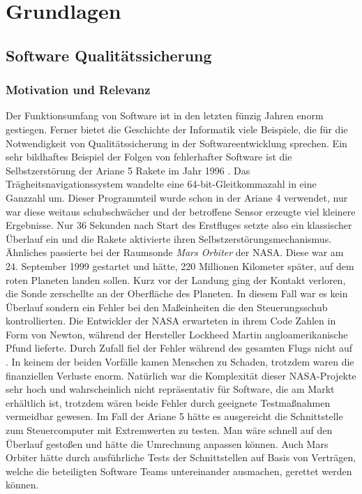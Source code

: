 \chapter{Grundlagen}
\label{sec:fundamentals}

\section{Software Qualitätssicherung}
\label{sec:software_quality}

\subsection{Motivation und Relevanz}
Der Funktionsumfang von Software ist in den letzten fünzig Jahren enorm gestiegen. Ferner bietet die Geschichte der Informatik viele Beispiele, die für die Notwendigkeit von Qualitätssicherung in der Softwareentwicklung sprechen. Ein sehr bildhaftes Beispiel der Folgen von fehlerhafter Software ist die Selbstzerstörung der Ariane 5 Rakete im Jahr 1996 \cite{giese_warum_2002}. Das Trägheitsnavigationssystem wandelte eine 64-bit-Gleitkommazahl in eine Ganzzahl um. Dieser Programmteil wurde schon in der Ariane 4 verwendet, nur war diese weitaus schubschwächer und der betroffene Sensor erzeugte viel kleinere Ergebnisse. Nur 36 Sekunden nach Start des Erstfluges setzte also ein klassischer Überlauf ein und die Rakete aktivierte ihren Selbstzerstörungsmechanismus.
Ähnliches passierte bei der Raumsonde \textit{Mars Orbiter} der NASA. Diese war am 24. September 1999 gestartet und hätte, 220 Millionen Kilometer später, auf dem roten Planeten landen sollen. Kurz vor der Landung ging der Kontakt verloren, die Sonde zerschellte an der Oberfläche des Planeten. In diesem Fall war es kein Überlauf sondern ein Fehler bei den Maßeinheiten die den Steuerungsschub kontrollierten. Die Entwickler der NASA erwarteten in ihrem Code Zahlen in Form von Newton, während der Hersteller Lockheed Martin angloamerikanische Pfund lieferte. Durch Zufall fiel der Fehler während des gesamten Flugs nicht auf \cite{thaller_software-test:_2002}.
In keinem der beiden Vorfälle kamen Menschen zu Schaden, trotzdem waren die finanziellen Verluste enorm. Natürlich war die Komplexität dieser NASA-Projekte sehr hoch und wahrscheinlich nicht repräsentativ für Software, die am Markt erhältlich ist, trotzdem wären beide Fehler durch geeignete Testmaßnahmen vermeidbar gewesen. Im Fall der Ariane 5 hätte es ausgereicht die Schnittstelle zum Steuercomputer mit Extremwerten zu testen. Man wäre schnell auf den Überlauf gestoßen und hätte die Umrechnung anpassen können. Auch Mars Orbiter hätte durch ausführliche Tests der Schnittstellen auf Basis von Verträgen, welche die beteiligten Software Teams untereinander ausmachen, gerettet werden können.

